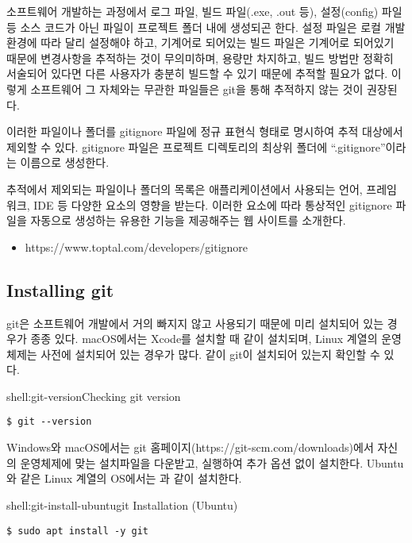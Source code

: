 소프트웨어 개발하는 과정에서 로그 파일, 빌드 파일(.exe, .out 등), 설정(config) 파일 등 소스 코드가 아닌 파일이 프로젝트 폴더 내에 생성되곤 한다. 설정 파일은 로컬 개발 환경에 따라 달리 설정해야 하고, 기계어로 되어있는 빌드 파일은 기계어로 되어있기 때문에 변경사항을 추적하는 것이 무의미하며, 용량만 차지하고, 빌드 방법만 정확히 서술되어 있다면 다른 사용자가 충분히 빌드할 수 있기 때문에 추적할 필요가 없다. 이렇게 소프트웨어 그 자체와는 무관한 파일들은 git을 통해 추적하지 않는 것이 권장된다.

이러한 파일이나 폴더를 gitignore 파일에 정규 표현식 형태로 명시하여 추적 대상에서 제외할 수 있다. gitignore 파일은 프로젝트 디렉토리의 최상위 폴더에 ``.gitignore''이라는 이름으로 생성한다. 

추적에서 제외되는 파일이나 폴더의 목록은 애플리케이션에서 사용되는 언어, 프레임워크, IDE 등 다양한 요소의 영향을 받는다. 이러한 요소에 따라 통상적인 gitignore 파일을 자동으로 생성하는 유용한 기능을 제공해주는 웹 사이트를 소개한다.

\begin{itemize}
    \item https://www.toptal.com/developers/gitignore
\end{itemize}

\subsection*{Installing git}

git은 소프트웨어 개발에서 거의 빠지지 않고 사용되기 때문에 미리 설치되어 있는 경우가 종종 있다. macOS에서는 Xcode를 설치할 때 같이 설치되며, Linux 계열의 운영체제는 사전에 설치되어 있는 경우가 많다. \과 같이 git이 설치되어 있는지 확인할 수 있다.

\begin{shellenv}{shell:git-version}{Checking git version}\begin{verbatim}
$ git --version
\end{verbatim}
\end{shellenv}

Windows와 macOS에서는 git 홈페이지(https://git-scm.com/downloads)에서 자신의 운영체제에 맞는 설치파일을 다운받고, 실행하여 추가 옵션 없이 설치한다. Ubuntu와 같은 Linux 계열의 OS에서는 과 같이 설치한다.

\begin{shellenv}{shell:git-install-ubuntu}{git Installation (Ubuntu)}\begin{verbatim}
$ sudo apt install -y git
\end{verbatim}
\end{shellenv}

